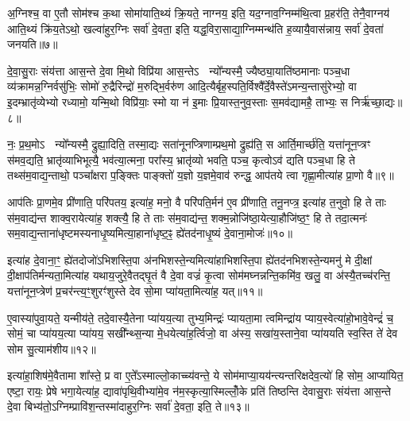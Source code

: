 अ॒ग्निश्च॒ वा ए॒तौ सोम॑श्च क॒था सोमा॑याति॒थ्यं क्रि॒यते॒ नाग्नय॒ इति॒ यद॒ग्नाव॒ग्निम्म॑थि॒त्वा प्र॒हर॑ति॒ तेनै॒वाग्नय॑ आति॒थ्यं क्रि॑य॒ते\-ऽथो॒ खल्वा॑हुर॒ग्निः सर्वा॑ दे॒वता॒ इति॒ यद्ध॒विरा॒साद्या॒ग्निम्मन्थ॑ति ह॒व्यायै॒वास॑न्नाय॒ सर्वा॑ दे॒वता॑ जनयति॥७॥

{\anuvakamend[{पत्नि॑या ए॒व जग॑त्या॒ आ त्रि॒वृद्वै प॑रि॒धीन् व॑द॒न्त्येक॑चत्वारिꣳशच्च}]}%

दे॒वा॒सु॒राः संय॑त्ता आस॒न्ते दे॒वा मि॒थो विप्रि॑या आस॒न्ते\-ऽ  न्यो᳚न्यस्मै॒ ज्यैष्ठ्या॒याति॑ष्ठमानाः पञ्च॒धा व्य॑क्रामन्न॒ग्नि\-र्वसु॑भिः॒ सोमो॑ रु॒द्रैरिन्द्रो॑ म॒रुद्भि॒र्वरु॑ण आदि॒त्यैर्बृह॒स्पति॒र्विश्वै᳚र्दे॒वैस्ते॑\-ऽमन्य॒न्तासु॑रेभ्यो॒ वा इ॒दम्भ्रातृ॑व्येभ्यो रध्यामो॒ यन्मि॒थो विप्रि॑याः॒ स्मो या न॑ इ॒माः प्रि॒यास्त॒नुव॒स्ताः स॒मव॑द्यामहै॒ ताभ्यः॒ स निर्\mbox{}ऋ॑च्छा॒द्यः॥८॥

नः॒ प्र॒थ॒मो\-ऽ  न्यो᳚न्यस्मै॒ द्रुह्या॒दिति॒ तस्मा॒द्यः सता॑नूनप्त्रिणाम्प्रथ॒मो द्रुह्य॑ति॒ स आर्ति॒मार्च्छ॑ति॒ यत्ता॑नून॒प्त्रꣳ स॑मव॒द्यति॒ भ्रातृ॑व्याभिभूत्यै॒ भव॑त्या॒त्मना॒ परा᳚स्य॒ भ्रातृ॑व्यो भवति॒ पञ्च॒ कृत्वो\-ऽव॑ द्यति पञ्च॒धा हि ते तथ्स॑म॒वाद्य॒न्ताथो॒ पञ्चा᳚क्षरा प॒ङ्क्तिः पाङ्क्तो॑ य॒ज्ञो य॒ज्ञमे॒वाव॑ रुन्द्ध॒ आप॑तये त्वा गृह्णा॒मीत्या॑ह प्रा॒णो वै॥९॥

आप॑तिः प्रा॒णमे॒व प्री॑णाति॒ परि॑पतय॒ इत्या॑ह॒ मनो॒ वै परि॑पति॒र्मन॑ ए॒व प्री॑णाति॒ तनू॒नप्त्र॒ इत्या॑ह त॒नुवो॒ हि ते ताः स॑म॒वाद्य॑न्त शाक्व॒रायेत्या॑ह॒ शक्त्यै॒ हि ते ताः स॑म॒वाद्य॑न्त॒ शक्म॒न्नोजि॑ष्ठा॒येत्या॒हौजि॑ष्ठ॒ꣳ॒ हि ते तदा॒त्मनः॑ सम॒वाद्य॒न्ताना॑धृष्टमस्यनाधृ॒ष्यमित्या॒हाना॑धृष्ट॒ꣴ॒ ह्ये॑तद॑नाधृ॒ष्यं दे॒वाना॒मोजः॑॥१०॥

इत्या॑ह दे॒वाना॒ꣳ॒ ह्ये॑तदोजो॑\-ऽभिशस्ति॒पा अ॑नभिशस्ते॒न्यमित्या॑हाभिशस्ति॒पा ह्ये॑तद॑नभिशस्ते॒न्यमनु॑ मे दी॒क्षां दी॒क्षाप॑तिर्मन्यता॒मित्या॑ह यथाय॒जुरे॒वैतद्घृ॒तं वै दे॒वा वज्रं॑ कृ॒त्वा सोम॑मघ्नन्नन्ति॒कमि॑व॒ खलु॒ वा अ॑स्यै॒तच्च॑रन्ति॒ यत्ता॑नून॒प्त्रेण॑ प्र॒चर॑न्त्य॒ꣳ॒शुरꣳ॑शुस्ते देव सो॒मा प्या॑यता॒मित्या॑ह॒ यत्॥११॥

ए॒वास्या॑पुवा॒यते॒ यन्मीय॑ते॒ तदे॒वास्यै॒तेना प्या॑यय॒त्या तुभ्य॒मिन्द्रः॑ प्यायता॒मा त्वमिन्द्रा॑य प्याय॒स्वेत्या॑हो॒भावे॒वेन्द्रं॑ च॒ सोमं॒ चा प्या॑यय॒त्या प्या॑यय॒ सखी᳚न्थ्स॒न्या मे॒धयेत्या॑ह॒र्त्विजो॒ वा अ॑स्य॒ सखा॑य॒स्ताने॒वा प्या॑ययति स्व॒स्ति ते॑ देव सोम सु॒त्याम॑शीय॥१२॥

इत्या॑हा॒शिष॑मे॒वैतामा शा᳚स्ते॒ प्र वा ए॒ते᳚\-ऽस्माल्लो॒काच्च्य॑वन्ते॒ ये सोम॑माप्या॒यय॑न्त्यन्तरिक्षदेव॒त्यो॑ हि सोम॒ आप्या॑यित॒ एष्टा॒ रायः॒ प्रेषे भगा॒येत्या॑ह॒ द्यावा॑पृथि॒वीभ्या॑मे॒व न॑म॒स्कृत्या॒स्मिल्लोँ॒के प्रति॑ तिष्ठन्ति देवासु॒राः संय॑त्ता आस॒न्ते दे॒वा बिभ्य॑तो॒\-ऽग्निम्प्रावि॑श॒न्तस्मा॑दाहुर॒ग्निः सर्वा॑ दे॒वता॒ इति॒ ते॥१३॥

